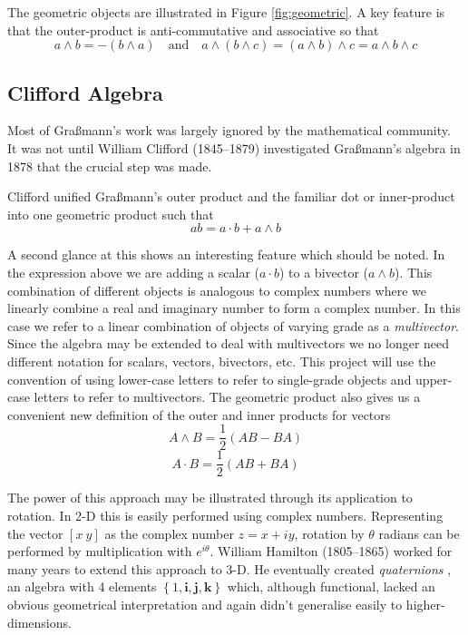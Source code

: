 The geometric objects are illustrated in Figure \ref{fig:geometric}. A 
key feature is that the outer-product is anti-commutative and 
associative so that
\begin{displaymath}
a \wedge b = - ( b \wedge a)\quad\mbox{and}\quad 
a \wedge (b \wedge c) = (a \wedge b) \wedge c = a \wedge b \wedge c
\end{displaymath}

\subsection{Clifford Algebra}

Most of Gra{\ss}mann's work was largely ignored by the mathematical community.
It was not until William Clifford (1845--1879) investigated Gra{\ss}mann's
algebra in 1878 \cite{clifford} that the crucial step was made.

Clifford unified Gra{\ss}mann's outer product and the familiar dot
or inner-product into one geometric product such that
\begin{displaymath}
ab = a\cdot b + a \wedge b
\end{displaymath}

A second glance at this shows an interesting feature which should be noted.
In the expression above we are adding a scalar ($a \cdot b$) to a 
bivector ($a \wedge b$). This combination of different objects is
analogous to complex numbers where we linearly combine
a real and imaginary number to form a complex number. In this case we
refer to a linear combination of objects of varying grade as a
\emph{multivector}. Since the algebra may be extended to deal with
multivectors we no longer need different notation for scalars, vectors,
bivectors, etc. This project will use the convention of using lower-case
letters to refer to single-grade objects and upper-case letters to refer
to multivectors. The geometric product also gives us a convenient new
definition of the outer and inner products for vectors
\[
A \wedge B = \frac{1}{2}(AB - BA)
\]
\[
A \cdot B = \frac{1}{2}(AB + BA)
\]

The power of this approach may be illustrated through its application
to rotation. In 2-D this is easily performed using complex numbers. Representing
the vector $[x\ y]$ as the complex number $z = x + iy$, rotation by
$\theta$ radians can be performed by multiplication with $e^{i\theta}$.
William Hamilton (1805--1865) worked for many years to extend this approach
to 3-D. He eventually created \emph{quaternions} \cite{hamilton2,hamilton1},
an algebra with 4 
elements $\left\{1, \mathbf{i}, \mathbf{j}, \mathbf{k}\right\}$ which, although
functional, lacked an obvious geometrical interpretation and again didn't
generalise easily to higher-dimensions.

